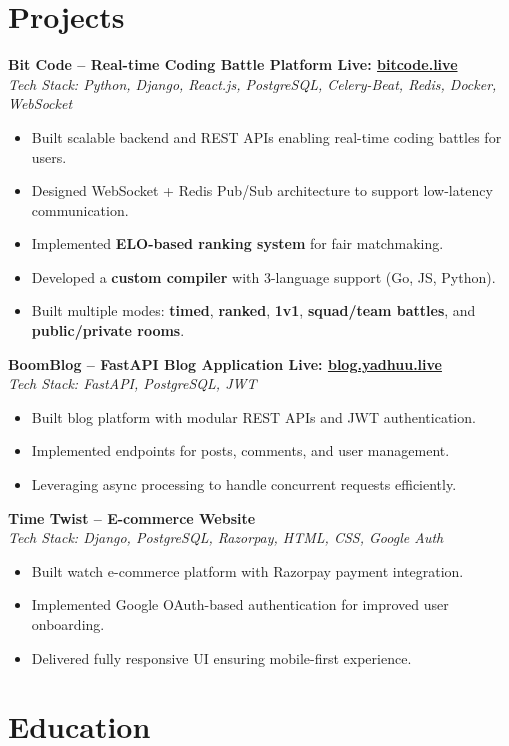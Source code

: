 \documentclass[a4paper,9.5pt]{article}
\newcommand{\job}[3]{%
  \noindent\textbf{#1} \hfill \textit{#2}\\%
  \RaggedRight #3\vspace{4pt}%
}
\begin{document}
\section*{Projects}

\job{Bit Code – Real-time Coding Battle Platform  \hfill \textbf{Live:} \href{https://www.bitcode.live/}{bitcode.live}}{}{%
\textit{Tech Stack: Python, Django, React.js, PostgreSQL, Celery-Beat, Redis, Docker, WebSocket}
\begin{itemize}
    \item Built scalable backend and REST APIs enabling real-time coding battles for users.
    \item Designed WebSocket + Redis Pub/Sub architecture to support low-latency communication.
    \item Implemented \textbf{ELO-based ranking system} for fair matchmaking.
    \item Developed a \textbf{custom compiler} with 3-language support (Go, JS, Python).
    \item Built multiple modes: \textbf{timed}, \textbf{ranked}, \textbf{1v1}, \textbf{squad/team battles}, and \textbf{public/private rooms}.
\end{itemize}
}

\job{BoomBlog – FastAPI Blog Application  \hfill \textbf{Live:} \href{https://blog.yadhuu.live/}{blog.yadhuu.live}}{}{%
\textit{Tech Stack: FastAPI, PostgreSQL, JWT}
\begin{itemize}
    \item Built blog platform with modular REST APIs and JWT authentication.
    \item Implemented endpoints for posts, comments, and user management.
    \item Leveraging async processing to handle concurrent requests efficiently.
\end{itemize}
}

\job{Time Twist – E-commerce Website}{}{%
\textit{Tech Stack: Django, PostgreSQL, Razorpay, HTML, CSS, Google Auth}
\begin{itemize}
    \item Built watch e-commerce platform with Razorpay payment integration.
    \item Implemented Google OAuth-based authentication for improved user onboarding.
    \item Delivered fully responsive UI ensuring mobile-first experience.
\end{itemize}
}

\section*{Education}
\end{document}
